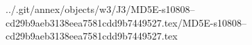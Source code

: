 ../.git/annex/objects/w3/J3/MD5E-s10808--cd29b9aeb3138eea7581cdd9b7449527.tex/MD5E-s10808--cd29b9aeb3138eea7581cdd9b7449527.tex
